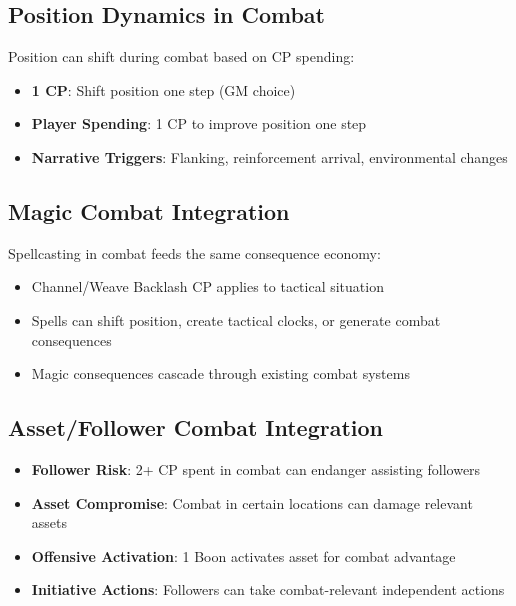 \subsection{Position Dynamics in Combat}

Position can shift during combat based on CP spending:

\begin{itemize}
    \item \textbf{1 CP}: Shift position one step (GM choice)
    \item \textbf{Player Spending}: 1 CP to improve position one step
    \item \textbf{Narrative Triggers}: Flanking, reinforcement arrival, environmental changes
\end{itemize}

\subsection{Magic Combat Integration}

Spellcasting in combat feeds the same consequence economy:

\begin{itemize}
    \item Channel/Weave Backlash CP applies to tactical situation
    \item Spells can shift position, create tactical clocks, or generate combat consequences
    \item Magic consequences cascade through existing combat systems
\end{itemize}

\subsection{Asset/Follower Combat Integration}

\begin{itemize}
    \item \textbf{Follower Risk}: 2+ CP spent in combat can endanger assisting followers
    \item \textbf{Asset Compromise}: Combat in certain locations can damage relevant assets  
    \item \textbf{Offensive Activation}: 1 Boon activates asset for combat advantage
    \item \textbf{Initiative Actions}: Followers can take combat-relevant independent actions
\end{itemize}

